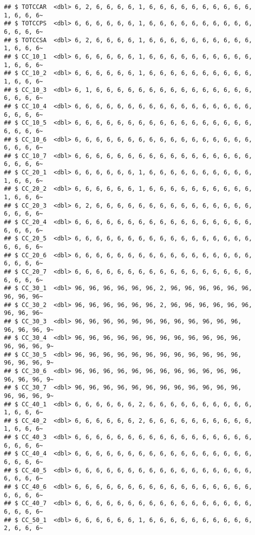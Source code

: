 \documentclass[
]{article}
\begin{document}
\begin{verbatim}
## $ TOTCCAR  <dbl> 6, 2, 6, 6, 6, 6, 1, 6, 6, 6, 6, 6, 6, 6, 6, 6, 6, 1, 6, 6, 6~
## $ TOTCCPS  <dbl> 6, 6, 6, 6, 6, 6, 1, 6, 6, 6, 6, 6, 6, 6, 6, 6, 6, 6, 6, 6, 6~
## $ TOTCCSA  <dbl> 6, 2, 6, 6, 6, 6, 1, 6, 6, 6, 6, 6, 6, 6, 6, 6, 6, 1, 6, 6, 6~
## $ CC_10_1  <dbl> 6, 6, 6, 6, 6, 6, 1, 6, 6, 6, 6, 6, 6, 6, 6, 6, 6, 1, 6, 6, 6~
## $ CC_10_2  <dbl> 6, 6, 6, 6, 6, 6, 1, 6, 6, 6, 6, 6, 6, 6, 6, 6, 6, 1, 6, 6, 6~
## $ CC_10_3  <dbl> 6, 1, 6, 6, 6, 6, 6, 6, 6, 6, 6, 6, 6, 6, 6, 6, 6, 6, 6, 6, 6~
## $ CC_10_4  <dbl> 6, 6, 6, 6, 6, 6, 6, 6, 6, 6, 6, 6, 6, 6, 6, 6, 6, 6, 6, 6, 6~
## $ CC_10_5  <dbl> 6, 6, 6, 6, 6, 6, 6, 6, 6, 6, 6, 6, 6, 6, 6, 6, 6, 6, 6, 6, 6~
## $ CC_10_6  <dbl> 6, 6, 6, 6, 6, 6, 6, 6, 6, 6, 6, 6, 6, 6, 6, 6, 6, 6, 6, 6, 6~
## $ CC_10_7  <dbl> 6, 6, 6, 6, 6, 6, 6, 6, 6, 6, 6, 6, 6, 6, 6, 6, 6, 6, 6, 6, 6~
## $ CC_20_1  <dbl> 6, 6, 6, 6, 6, 6, 1, 6, 6, 6, 6, 6, 6, 6, 6, 6, 6, 1, 6, 6, 6~
## $ CC_20_2  <dbl> 6, 6, 6, 6, 6, 6, 1, 6, 6, 6, 6, 6, 6, 6, 6, 6, 6, 1, 6, 6, 6~
## $ CC_20_3  <dbl> 6, 2, 6, 6, 6, 6, 6, 6, 6, 6, 6, 6, 6, 6, 6, 6, 6, 6, 6, 6, 6~
## $ CC_20_4  <dbl> 6, 6, 6, 6, 6, 6, 6, 6, 6, 6, 6, 6, 6, 6, 6, 6, 6, 6, 6, 6, 6~
## $ CC_20_5  <dbl> 6, 6, 6, 6, 6, 6, 6, 6, 6, 6, 6, 6, 6, 6, 6, 6, 6, 6, 6, 6, 6~
## $ CC_20_6  <dbl> 6, 6, 6, 6, 6, 6, 6, 6, 6, 6, 6, 6, 6, 6, 6, 6, 6, 6, 6, 6, 6~
## $ CC_20_7  <dbl> 6, 6, 6, 6, 6, 6, 6, 6, 6, 6, 6, 6, 6, 6, 6, 6, 6, 6, 6, 6, 6~
## $ CC_30_1  <dbl> 96, 96, 96, 96, 96, 96, 2, 96, 96, 96, 96, 96, 96, 96, 96, 96~
## $ CC_30_2  <dbl> 96, 96, 96, 96, 96, 96, 2, 96, 96, 96, 96, 96, 96, 96, 96, 96~
## $ CC_30_3  <dbl> 96, 96, 96, 96, 96, 96, 96, 96, 96, 96, 96, 96, 96, 96, 96, 9~
## $ CC_30_4  <dbl> 96, 96, 96, 96, 96, 96, 96, 96, 96, 96, 96, 96, 96, 96, 96, 9~
## $ CC_30_5  <dbl> 96, 96, 96, 96, 96, 96, 96, 96, 96, 96, 96, 96, 96, 96, 96, 9~
## $ CC_30_6  <dbl> 96, 96, 96, 96, 96, 96, 96, 96, 96, 96, 96, 96, 96, 96, 96, 9~
## $ CC_30_7  <dbl> 96, 96, 96, 96, 96, 96, 96, 96, 96, 96, 96, 96, 96, 96, 96, 9~
## $ CC_40_1  <dbl> 6, 6, 6, 6, 6, 6, 2, 6, 6, 6, 6, 6, 6, 6, 6, 6, 6, 1, 6, 6, 6~
## $ CC_40_2  <dbl> 6, 6, 6, 6, 6, 6, 2, 6, 6, 6, 6, 6, 6, 6, 6, 6, 6, 1, 6, 6, 6~
## $ CC_40_3  <dbl> 6, 6, 6, 6, 6, 6, 6, 6, 6, 6, 6, 6, 6, 6, 6, 6, 6, 6, 6, 6, 6~
## $ CC_40_4  <dbl> 6, 6, 6, 6, 6, 6, 6, 6, 6, 6, 6, 6, 6, 6, 6, 6, 6, 6, 6, 6, 6~
## $ CC_40_5  <dbl> 6, 6, 6, 6, 6, 6, 6, 6, 6, 6, 6, 6, 6, 6, 6, 6, 6, 6, 6, 6, 6~
## $ CC_40_6  <dbl> 6, 6, 6, 6, 6, 6, 6, 6, 6, 6, 6, 6, 6, 6, 6, 6, 6, 6, 6, 6, 6~
## $ CC_40_7  <dbl> 6, 6, 6, 6, 6, 6, 6, 6, 6, 6, 6, 6, 6, 6, 6, 6, 6, 6, 6, 6, 6~
## $ CC_50_1  <dbl> 6, 6, 6, 6, 6, 6, 1, 6, 6, 6, 6, 6, 6, 6, 6, 6, 6, 2, 6, 6, 6~

\end{verbatim}
\end{document}
